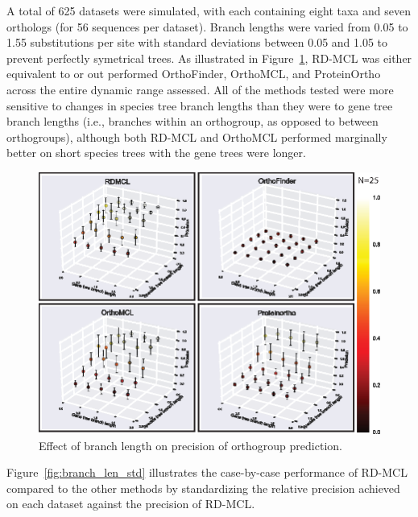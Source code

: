 \documentclass[twocolumn]{bmcart}%
\begin{document}

A total of 625 datasets were simulated, with each containing eight taxa and seven orthologs (for 56 sequences per dataset).
Branch lengths were varied from 0.05 to 1.55 substitutions per site with standard deviations between 0.05 and 1.05 to prevent perfectly symetrical trees.
As illustrated in Figure~\ref{fig:branch_len_3d}, RD-MCL was either equivalent to or out performed OrthoFinder, OrthoMCL, and ProteinOrtho across the entire dynamic range assessed.
All of the methods tested were more sensitive to changes in species tree branch lengths than they were to gene tree branch lengths (i.e., branches within an orthogroup, as opposed to between orthogroups), although both RD-MCL and OrthoMCL performed marginally better on short species trees with the gene trees were longer.

\begin{figure}[t]
  \begin{center}
  \includegraphics[height=0.25\textheight]{../figures/branch_len_3D_scatter.eps}
\end{center}
\caption{Effect of branch length on precision of orthogroup prediction.}
\label{fig:branch_len_3d}
\end{figure}

Figure~\ref{fig:branch_len_std} illustrates the case-by-case performance of RD-MCL compared to the other methods by standardizing the relative precision achieved on each dataset against the precision of RD-MCL\@.
\end{document}
